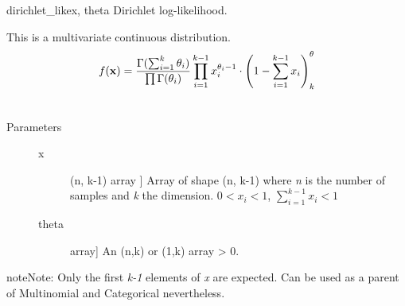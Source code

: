 \hypertarget{pymc.distributions.dirichlet_like}{}\begin{funcdesc}{dirichlet\_like}{x, theta}
Dirichlet log-likelihood.

This is a multivariate continuous distribution.
\begin{gather}
\begin{split}f(\mathbf{x}) = \frac{\Gamma(\sum_{i=1}^k \theta_i)}{\prod \Gamma(\theta_i)}\prod_{i=1}^{k-1} x_i^{\theta_i - 1}\cdot\left(1-\sum_{i=1}^{k-1}x_i\right)^\theta_k\end{split}\notag\\\begin{split}\end{split}\notag
\end{gather}\begin{description}
\item[Parameters] \leavevmode\begin{description}
\item[x] \leavevmode{[}(n, k-1) array {]}
Array of shape (n, k-1) where \emph{n} is the number of samples 
and \emph{k} the dimension. 
$0 < x_i < 1$,  $\sum_{i=1}^{k-1} x_i < 1$
\item[theta] \leavevmode{[}array{]}
An (n,k) or (1,k) array \textgreater{} 0.

\end{description}

\end{description}

\begin{notice}{note}{Note:}
Only the first \emph{k-1} elements of \emph{x} are expected. Can be used as a parent of Multinomial and Categorical
nevertheless.
\end{notice}
\end{funcdesc}

